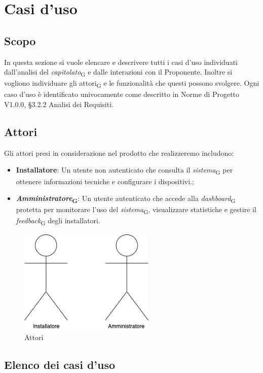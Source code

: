 \section{Casi d'uso}
\subsection{Scopo}
In questa sezione si vuole elencare e descrivere tutti i casi d'uso individuati dall'analisi del \textit{capitolato}\textsubscript{G} e dalle interazioni con il Proponente. Inoltre si vogliono individuare gli attori\textsubscript{G} e le funzionalità che questi possono svolgere. Ogni caso d'uso è identificato univocamente come descritto in Norme di Progetto V1.0.0,  §3.2.2 Analisi dei Requisiti.

\subsection{Attori}
Gli attori presi in considerazione nel prodotto che realizzeremo includono:
\begin{itemize}
    \item \textbf{Installatore}: Un utente non autenticato che consulta il \textit{sistema}\textsubscript{G} per ottenere informazioni tecniche e configurare i dispositivi.; 
    \item \textbf{\textit{Amministratore}\textsubscript{G}}: Un utente autenticato che accede alla \textit{dashboard}\textsubscript{G} protetta per monitorare l’uso del \textit{sistema}\textsubscript{G}, visualizzare statistiche e gestire il \textit{feedback}\textsubscript{G} degli installatori.
\end{itemize}
\begin{figure}[H]
\centering
\includegraphics[height=5cm]{contents/casi_duso/png/attori.png}
\caption{Attori}
\end{figure}

\subsection{Elenco dei casi d'uso}
